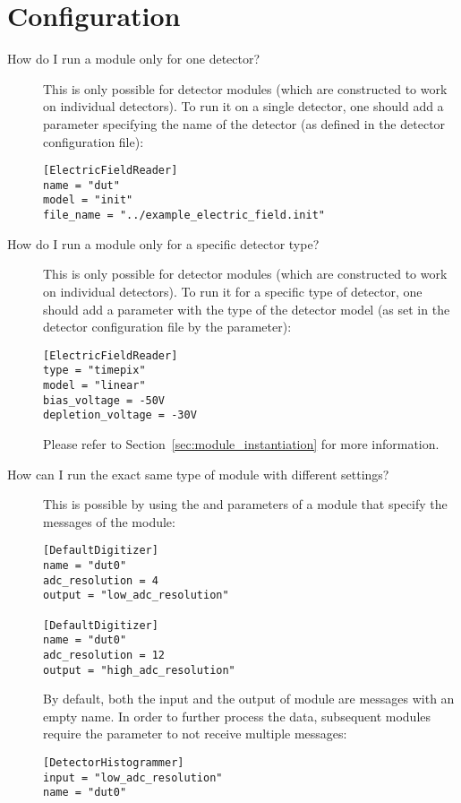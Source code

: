 \section{Configuration}
\begin{description}
\item[How do I run a module only for one detector?]
This is only possible for detector modules (which are constructed to work on individual detectors).
To run it on a single detector, one should add a parameter  specifying the name of the detector (as defined in the detector configuration file):
\begin{verbatim}
[ElectricFieldReader]
name = "dut"
model = "init"
file_name = "../example_electric_field.init"
\end{verbatim}
\item[How do I run a module only for a specific detector type?]
This is only possible for detector modules (which are constructed to work on individual detectors).
To run it for a specific type of detector, one should add a parameter  with the type of the detector model (as set in the detector configuration file by the  parameter):
\begin{verbatim}
[ElectricFieldReader]
type = "timepix"
model = "linear"
bias_voltage = -50V
depletion_voltage = -30V
\end{verbatim}
Please refer to Section~\ref{sec:module_instantiation} for more information.
\item[How can I run the exact same type of module with different settings?] This is possible by using the  and  parameters of a module that specify the messages of the module:
\begin{verbatim}
[DefaultDigitizer]
name = "dut0"
adc_resolution = 4
output = "low_adc_resolution"

[DefaultDigitizer]
name = "dut0"
adc_resolution = 12
output = "high_adc_resolution"
\end{verbatim}
By default, both the input and the output of module are messages with an empty name.
In order to further process the data, subsequent modules require the  parameter to not receive multiple messages:
\begin{verbatim}
[DetectorHistogrammer]
input = "low_adc_resolution"
name = "dut0"


\end{verbatim}
\end{description}
